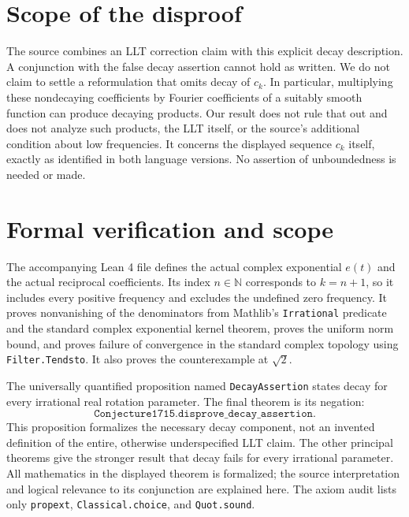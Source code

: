 \documentclass[11pt]{article}
\begin{document}
\section*{Scope of the disproof}
The source combines an LLT correction claim with this explicit decay
description. A conjunction with the false decay assertion cannot hold
as written. We do not claim to settle a reformulation that omits decay
of $c_k$. In particular, multiplying these nondecaying coefficients by
Fourier coefficients of a suitably smooth function can produce decaying
products. Our result does not rule that out and does not analyze such
products, the LLT itself, or the source's additional condition about
low frequencies. It concerns the displayed sequence $c_k$ itself, exactly
as identified in both language versions. No assertion of unboundedness
is needed or made.

\section*{Formal verification and scope}
The accompanying Lean 4 file defines the actual complex exponential
$e(t)$ and the actual reciprocal coefficients. Its index $n\in\mathbb N$
corresponds to $k=n+1$, so it includes every positive frequency and
excludes the undefined zero frequency. It proves nonvanishing of the
denominators from Mathlib's \texttt{Irrational} predicate and the standard
complex exponential kernel theorem, proves the uniform norm bound, and
proves failure of convergence in the standard complex topology using
\texttt{Filter.Tendsto}. It also proves the counterexample at $\sqrt2$.

The universally quantified proposition named \texttt{DecayAssertion}
states decay for every irrational real rotation parameter. The final
theorem is its negation:
\[
\texttt{Conjecture1715.disprove\_decay\_assertion}.
\]
This proposition formalizes the necessary decay component, not an
invented definition of the entire, otherwise underspecified LLT claim.
The other principal theorems give the stronger result that decay fails
for every irrational parameter. All mathematics in the displayed theorem
is formalized; the source interpretation and logical relevance to its
conjunction are explained here. The axiom audit lists only
\texttt{propext}, \texttt{Classical.choice}, and \texttt{Quot.sound}.
\end{document}
